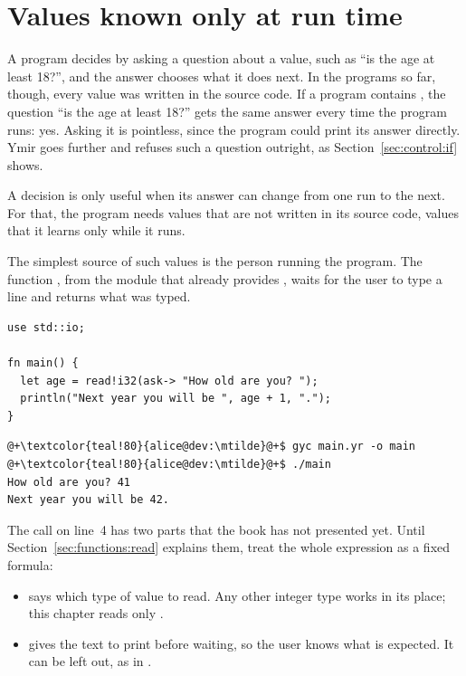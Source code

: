 \vfill\pagebreak
\section{Values known only at run time}
\label{sec:control:runtime_values}

A program decides by asking a question about a value, such as ``is the age at
least 18?'', and the answer chooses what it does next. In the programs so far,
though, every value was written in the source code. If a program contains
, the question ``is the age at least 18?'' gets the same
answer every time the program runs: yes. Asking it is pointless, since the
program could print its answer directly. Ymir goes further and refuses such a
question outright, as Section~\ref{sec:control:if} shows.

A decision is only useful when its answer can change from one run to the next.
For that, the program needs values that are not written in its source code,
values that it learns only while it runs.

The simplest source of such values is the person running the program. The
function , from the module  that already provides
, waits for the user to type a line and returns what was typed.

\begin{lstlisting}[style=coloredverbatim, caption=Reading a number typed by the user, label=lst:control:read_age]
use std::io;

fn main() {
  let age = read!i32(ask-> "How old are you? ");
  println("Next year you will be ", age + 1, ".");
}
\end{lstlisting}
\vspace{-10pt}%
\begin{lstlisting}[style=bashVerb, escapechar=@+]
@+\textcolor{teal!80}{alice@dev:\mtilde}@+$ gyc main.yr -o main
@+\textcolor{teal!80}{alice@dev:\mtilde}@+$ ./main
How old are you? 41
Next year you will be 42.
\end{lstlisting}

The call on line~4 has two parts that the book has not presented yet. Until
Section~\ref{sec:functions:read} explains them, treat the whole expression as a
fixed formula:

\begin{itemize}
\item {} says which type of value to read. Any other integer type
  works in its place; this chapter reads only .
\item {} gives the text to print before waiting, so the user
  knows what is expected. It can be left out, as in .
\end{itemize}

